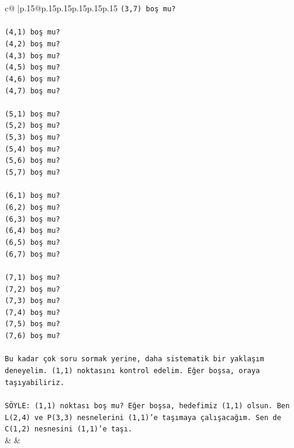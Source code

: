 \documentclass{article}
\begin{document}
{\begin{supertabular}{c@{$\;$}|p{.15\linewidth}@{}p{.15\linewidth}p{.15\linewidth}p{.15\linewidth}p{.15\linewidth}p{.15\linewidth}}
{{{\texttt{(3,7) boş mu?} \\
\\ 
\texttt{(4,1) boş mu?} \\
\texttt{(4,2) boş mu?} \\
\texttt{(4,3) boş mu?} \\
\texttt{(4,5) boş mu?} \\
\texttt{(4,6) boş mu?} \\
\texttt{(4,7) boş mu?} \\
\\ 
\texttt{(5,1) boş mu?} \\
\texttt{(5,2) boş mu?} \\
\texttt{(5,3) boş mu?} \\
\texttt{(5,4) boş mu?} \\
\texttt{(5,6) boş mu?} \\
\texttt{(5,7) boş mu?} \\
\\ 
\texttt{(6,1) boş mu?} \\
\texttt{(6,2) boş mu?} \\
\texttt{(6,3) boş mu?} \\
\texttt{(6,4) boş mu?} \\
\texttt{(6,5) boş mu?} \\
\texttt{(6,7) boş mu?} \\
\\ 
\texttt{(7,1) boş mu?} \\
\texttt{(7,2) boş mu?} \\
\texttt{(7,3) boş mu?} \\
\texttt{(7,4) boş mu?} \\
\texttt{(7,5) boş mu?} \\
\texttt{(7,6) boş mu?} \\
\\ 
\texttt{Bu kadar çok soru sormak yerine, daha sistematik bir yaklaşım deneyelim. (1,1) noktasını kontrol edelim. Eğer boşsa, oraya taşıyabiliriz.} \\
\\ 
\texttt{SÖYLE: (1,1) noktası boş mu? Eğer boşsa, hedefimiz (1,1) olsun. Ben L(2,4) ve P(3,3) nesnelerini (1,1)'e taşımaya çalışacağım. Sen de C(1,2) nesnesini (1,1)'e taşı.} \\
            }
        }
    }
    & & \\ \\


\end{supertabular}}
\end{document}
